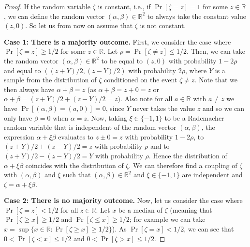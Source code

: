 \documentclass[english]{article}
\theoremstyle{remark}
\numberwithin{equation}{section}
\numberwithin{figure}{section}
\newcommand{\RR}{\mathbb{R}}
\begin{document}
\begin{proof}
    If the random variable $\zeta$ is constant, i.e., if $\Pr[\zeta=z]=1$ for some $z\in \RR$, we can define the random vector $(\alpha,\beta)\in \RR^2$ to always take the constant value $(z,0)$. So let us from now on assume that $\zeta$ is not constant.
    
    \textbf{Case 1: There is a majority outcome.} First, we consider the case where $\Pr[\zeta=z]\ge 1/2$ for some $z\in \RR$. Let $\rho=\Pr[\zeta\ne z]\le 1/2$. Then, we can take the random vector $(\alpha,\beta)\in \RR^2$ to be equal to $(z,0)$ with probability $1-2\rho$ and equal to $((z+Y)/2,(z-Y)/2)$ with probability $2\rho$, where $Y$ is a sample from the distribution of $\zeta$ conditioned on the event $\zeta\ne z$. Note that we then always have $\alpha+\beta=z$ (as $\alpha+\beta=z+0=z$ or $\alpha+\beta=(z+Y)/2+(z-Y)/2=z$). Also note for all $a\in \RR$ with $a\ne z$ we have $\Pr[(\alpha,\beta)=(a,0)]=0$, since $Y$ never takes the value $z$ and so we can only have $\beta=0$ when $\alpha=z$. Now, taking $\xi\in\{-1,1\}$ to be a Rademacher random variable that is independent of the random vector $(\alpha,\beta)$, the expression $\alpha+\xi \beta$ evaluates to $z\pm 0=z$ with probability $1-2\rho$, to $(z+Y)/2+(z-Y)/2=z$ with probability $\rho$ and to $(z+Y)/2-(z-Y)/2=Y$ with probability $\rho$. Hence the distribution of $\alpha+\xi \beta$ coincides with the distribution of $\zeta$. We can therefore find a coupling of $\zeta$ with $(\alpha,\beta)$ and $\xi$ such that $(\alpha,\beta)\in \RR^2$ and $\xi\in\{-1,1\}$ are independent and $\zeta=\alpha+\xi \beta$.
    
    \textbf{Case 2: There is no majority outcome.} Now, let us consider the case where $\Pr[\zeta=z]< 1/2$ for all $z\in \RR$. Let $x$ be a median of $\zeta$ (meaning that $\Pr[\zeta\ge x]\ge 1/2$ and $\Pr[\zeta\le x]\ge 1/2$; for example we can take $x=\sup \{x\in \RR:\Pr[\zeta\ge x]\ge 1/2\}$).
    As $\Pr[\zeta= x]<1/2$, we can see that $0<\Pr[\zeta< x]\le 1/2$ and $0<\Pr[\zeta> x]\le 1/2$.


\end{proof}
\end{document}
